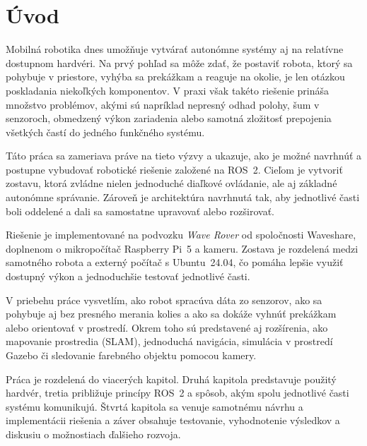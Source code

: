       
      
        \chapter{Úvod}
      
        Mobilná robotika dnes umožňuje vytvárať autonómne systémy aj na relatívne dostupnom hardvéri. Na prvý pohľad sa môže zdať, že postaviť robota, ktorý sa pohybuje v priestore, vyhýba sa prekážkam a reaguje na okolie, je len otázkou poskladania niekoľkých komponentov. V praxi však takéto riešenie prináša množstvo problémov, akými sú napríklad nepresný odhad polohy, šum v senzoroch, obmedzený výkon zariadenia alebo samotná zložitosť prepojenia všetkých častí do jedného funkčného systému.
      
        Táto práca sa zameriava práve na tieto výzvy a ukazuje, ako je možné navrhnúť a postupne vybudovať robotické riešenie založené na ROS~2. Cieľom je vytvoriť zostavu, ktorá zvládne nielen jednoduché diaľkové ovládanie, ale aj základné autonómne správanie. Zároveň je architektúra navrhnutá tak, aby jednotlivé časti boli oddelené a dali sa samostatne upravovať alebo rozširovať.
      
        Riešenie je implementované na podvozku \emph{Wave Rover} od spoločnosti Waveshare, doplnenom o mikropočítač Raspberry Pi~5 a kameru. Zostava je rozdelená medzi samotného robota a externý počítač s Ubuntu~24.04, čo pomáha lepšie využiť dostupný výkon a jednoduchšie testovať jednotlivé časti.
      
        V priebehu práce vysvetlím, ako robot spracúva dáta zo senzorov, ako sa pohybuje aj bez presného merania kolies a ako sa dokáže vyhnúť prekážkam alebo orientovať v prostredí. Okrem toho sú predstavené aj rozšírenia, ako mapovanie prostredia (SLAM), jednoduchá navigácia, simulácia v prostredí Gazebo či sledovanie farebného objektu pomocou kamery.
      
        Práca je rozdelená do viacerých kapitol. Druhá kapitola predstavuje použitý hardvér, tretia približuje princípy ROS~2 a spôsob, akým spolu jednotlivé časti systému komunikujú. Štvrtá kapitola sa venuje samotnému návrhu a implementácii riešenia a záver obsahuje testovanie, vyhodnotenie výsledkov a diskusiu o možnostiach ďalšieho rozvoja.
      
